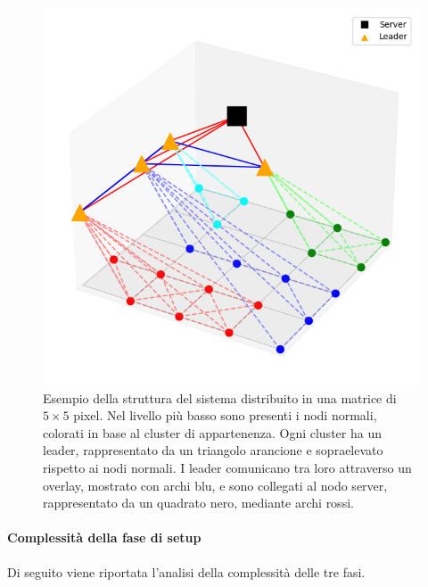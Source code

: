 \documentclass[12pt, a4paper]{report}
\begin{document}
\begin{figure}
    \centering
    \includegraphics[width=0.5\linewidth]{images/setup/Esempio_Grafo_G.png}
    \caption{Esempio della struttura del sistema distribuito in una matrice di $5\times5$ pixel. Nel livello pi\`u basso sono presenti i nodi normali, colorati in base al cluster di appartenenza. Ogni cluster ha un leader, rappresentato da un triangolo arancione e sopraelevato rispetto ai nodi normali. I leader comunicano tra loro attraverso un overlay, mostrato con archi blu, e sono collegati al nodo server, rappresentato da un quadrato nero, mediante archi rossi.}
    \label{fig:enter-label}
\end{figure}

\paragraph{Complessit\`a della fase di setup}\label{par:complessita_setup}

Di seguito viene riportata l'analisi della complessit\`a delle tre fasi.
\end{document}
